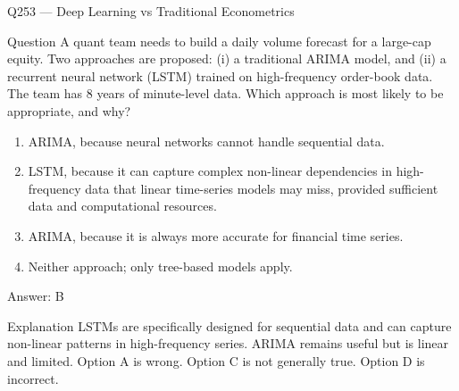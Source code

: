 \documentclass[aspectratio=169,8pt]{beamer}
\begin{document}
\begin{frame}{Q253 --- Deep Learning vs Traditional Econometrics}
\begin{block}{Question}
A quant team needs to build a daily volume forecast for a large-cap equity. Two approaches are proposed: (i) a traditional ARIMA model, and (ii) a recurrent neural network (LSTM) trained on high-frequency order-book data. The team has 8 years of minute-level data. Which approach is most likely to be appropriate, and why?
\end{block}
\begin{enumerate}
\item ARIMA, because neural networks cannot handle sequential data.
\item LSTM, because it can capture complex non-linear dependencies in high-frequency data that linear time-series models may miss, provided sufficient data and computational resources.
\item ARIMA, because it is always more accurate for financial time series.
\item Neither approach; only tree-based models apply.
\end{enumerate}
\begin{exampleblock}{Answer: B}\end{exampleblock}
\begin{block}{Explanation}
LSTMs are specifically designed for sequential data and can capture non-linear patterns in high-frequency series. ARIMA remains useful but is linear and limited. Option A is wrong. Option C is not generally true. Option D is incorrect.
\end{block}
\end{frame}
\end{document}
